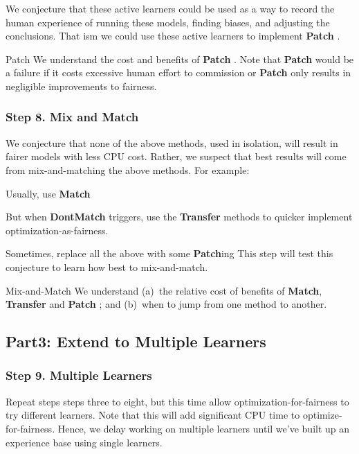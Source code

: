 We conjecture that these active learners could be used as a way to record the human experience
of running these models, finding biases, and adjusting the conclusions. That ism
we could use these active learners to implement {\bf Patch} .

\begin{success}{Patch}
We understand the cost and benefits of {\bf Patch} . Note that {\bf Patch}  would be a failure
if it costs excessive human effort to commission or   {\bf Patch}   
only results in negligible improvements to fairness.
\end{success}

\subsubsection{ Step 8. Mix and Match}
We conjecture that none of the above methods, used in isolation, will result in fairer
models with less CPU cost. Rather, we suspect that best results will come from mix-and-matching
the above methods. For example:
\bi
\item Usually, use {\bf Match} 
\item But when {\bf DontMatch} triggers, use the {\bf Transfer} methods to quicker implement 
optimization-as-fairness.
\item Sometimes, replace all the above with some {\bf Patch}ing
\ei
This step will test this conjecture to learn how best to mix-and-match.

\begin{success}{Mix-and-Match}
We understand (a)~the relative cost of benefits of {\bf Match}, {\bf Transfer}  and {\bf Patch} ;
and (b)~when to jump from one method to another.
\end{success}
 
 \subsection{Part3: Extend to Multiple Learners}
 
\subsubsection{ Step 9. Multiple Learners}
Repeat steps steps three to eight, but this time allow optimization-for-fairness to 
try different learners. Note that this will add significant CPU time to optimize-for-fairness.
Hence, we delay working on multiple learners until we've built up an experience base using
single learners.
 

